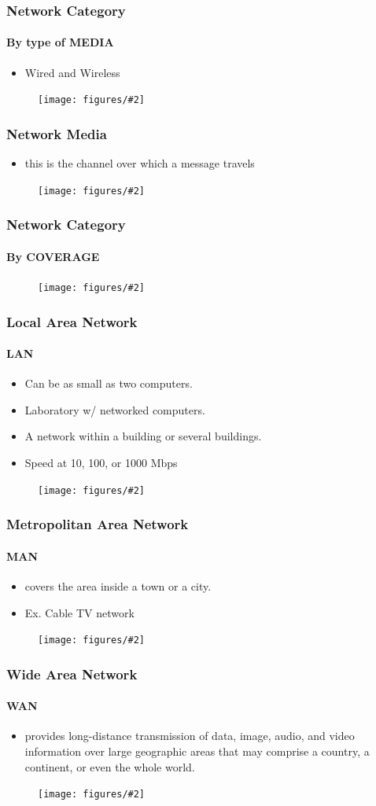 \documentclass{beamer}
\newcommand{\ns}{\vspace{-0.5cm}}  %
\newcommand{\fig}[2]{
\begin{center}
\begin{figure}
\texttt{[image: figures/\#2]}
\end{figure}
\end{center}
}
\begin{document}
\begin{frame}
\frametitle{Network Category}
\framesubtitle{By type of MEDIA}
\begin{itemize} 
\Large
\item <1-> Wired and Wireless
\end{itemize}

\ns
\qquad \fig{0.5}{network_cat}
\end{frame}


\begin{frame}
\frametitle{Network Media}
\begin{itemize} 
\Large
\item <1-> this is the channel over which a message travels
\end{itemize}
\fig{0.5}{network_media}
\end{frame}


\begin{frame}
\frametitle{Network Category}
\framesubtitle{By COVERAGE}

\ns
\qquad \fig{0.5}{network_cov}
\end{frame}


\begin{frame}
\frametitle{Local Area Network}
\framesubtitle{LAN}
\begin{itemize} 
\Large
\item <2-> Can be as small as two computers.
\item <3-> Laboratory w/ networked computers.
\item <4-> A network within a building or several buildings.
\item <5-> Speed at 10, 100, or 1000 Mbps 
\end{itemize}

\fig{0.6}{network_lan}

\end{frame}



\begin{frame}
\frametitle{Metropolitan Area Network}
\framesubtitle{MAN}
\begin{itemize} 
\Large
\item <2-> covers the area inside a town or a city.
\item <3-> Ex. Cable TV network
\end{itemize}

\fig{0.45}{network_man}
\end{frame}


\begin{frame}
\frametitle{Wide Area Network}
\framesubtitle{WAN}
\begin{itemize} 
\Large
\item <2-> provides long-distance transmission of data, image, audio, and video information over large geographic areas that may comprise a country, a continent, or even the whole world.
\end{itemize}
 
\fig{0.4}{network_wan}
\end{frame}
\end{document}
